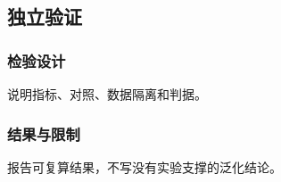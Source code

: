 \subsection{独立验证}

\subsubsection{检验设计}

说明指标、对照、数据隔离和判据。

\subsubsection{结果与限制}

报告可复算结果，不写没有实验支撑的泛化结论。

